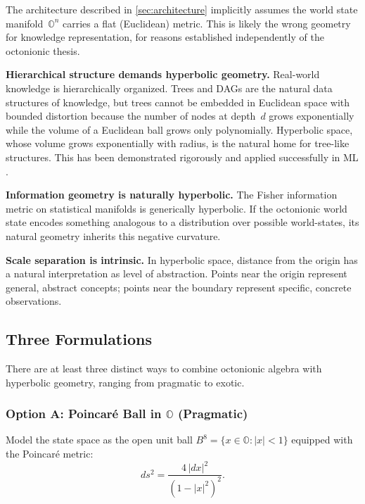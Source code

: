 \documentclass[11pt,a4paper]{article}
\newcommand{\Oct}{\mathbb{O}}
\begin{document}
The architecture described in \cref{sec:architecture} implicitly assumes the world state manifold~$\Oct^n$ carries a flat (Euclidean) metric. This is likely the wrong geometry for knowledge representation, for reasons established independently of the octonionic thesis.

\textbf{Hierarchical structure demands hyperbolic geometry.} Real-world knowledge is hierarchically organized. Trees and DAGs are the natural data structures of knowledge, but trees cannot be embedded in Euclidean space with bounded distortion because the number of nodes at depth~$d$ grows exponentially while the volume of a Euclidean ball grows only polynomially. Hyperbolic space, whose volume grows exponentially with radius, is the natural home for tree-like structures. This has been demonstrated rigorously \citep{Sarkar2011} and applied successfully in ML \citep{Nickel2017,Ganea2018}.

\textbf{Information geometry is naturally hyperbolic.} The Fisher information metric on statistical manifolds is generically hyperbolic. If the octonionic world state encodes something analogous to a distribution over possible world-states, its natural geometry inherits this negative curvature.

\textbf{Scale separation is intrinsic.} In hyperbolic space, distance from the origin has a natural interpretation as level of abstraction. Points near the origin represent general, abstract concepts; points near the boundary represent specific, concrete observations.

\subsection{Three Formulations}

There are at least three distinct ways to combine octonionic algebra with hyperbolic geometry, ranging from pragmatic to exotic.

\subsubsection{Option A: Poincar\'{e} Ball in \texorpdfstring{$\Oct$}{O} (Pragmatic)}

Model the state space as the open unit ball $B^8 = \{ x \in \Oct : \lvert x \rvert < 1 \}$ equipped with the Poincar\'{e} metric:
\begin{equation}
ds^2 = \frac{4\,\lvert dx \rvert^2}{(1 - \lvert x \rvert^2)^2}.
\end{equation}
\end{document}
